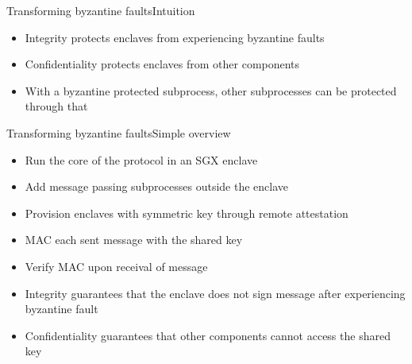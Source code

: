 \documentclass{beamer}
\begin{document}
\begin{frame}{Transforming byzantine faults}{Intuition}
	\begin{itemize}
		\item Integrity protects enclaves from experiencing byzantine faults

  	\vfill

		\item Confidentiality protects enclaves from other components

  	\vfill

		\item With a byzantine protected subprocess, other subprocesses can be protected through that

	\end{itemize}
\end{frame}

\begin{frame}{Transforming byzantine faults}{Simple overview}
	\begin{itemize}
		\item Run the core of the protocol in an SGX enclave

  	\vfill

		\item Add message passing subprocesses outside the enclave

  	\vfill

		\item Provision enclaves with symmetric key through remote attestation

  	\vfill

		\item MAC each sent message with the shared key

  	\vfill

		\item Verify MAC upon receival of message

  	\vfill

		\item Integrity guarantees that the enclave does not sign message after experiencing byzantine fault

  	\vfill

  	\item Confidentiality guarantees that other components cannot access the shared key

	\end{itemize}
\end{frame}
\end{document}

